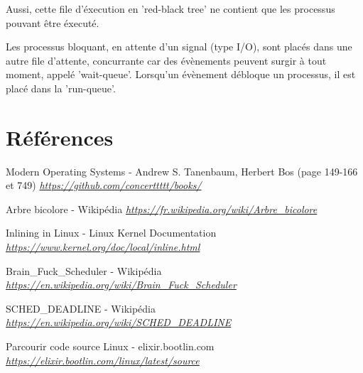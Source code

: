 \documentclass[10pt]{article}
\begin{document}
  Aussi, cette file d'éxecution en 'red-black tree' ne contient que les processus pouvant être éxecuté.
  
  Les processus bloquant, en attente d'un signal (type I/O), sont placés dans une autre file d'attente, concurrante car des évènements peuvent surgir à tout moment, appelé 'wait-queue'.
  Lorsqu'un évènement débloque un processus, il est placé dans la 'run-queue'.

    \newpage
    \section{Références}
    \begin{thebibliography}{}

        \label{modernos}
        Modern Operating Systems - Andrew S. Tanenbaum, Herbert Bos (page 149-166 et 749)\newline
        \href{https://github.com/concerttttt/books/blob/master/Modern Operating Systems 4th Edition--Andrew Tanenbaum.pdf}
        {\textit{https://github.com/concerttttt/books/}}\newline
	
        \label{rbtree}
        Arbre bicolore - Wikipédia\newline
        \href{https://fr.wikipedia.org/wiki/Arbre\_bicolore}
        {\textit{https://fr.wikipedia.org/wiki/Arbre\_bicolore}}\newline
	
        \label{inlinefunc}
        Inlining in Linux - Linux Kernel Documentation\newline
        \href{https://www.kernel.org/doc/local/inline.html}
        {\textit{https://www.kernel.org/doc/local/inline.html}}\newline
               
        \label{bfssched}
        Brain\_Fuck\_Scheduler - Wikipédia\newline
        \href{https://en.wikipedia.org/wiki/Brain\_Fuck\_Scheduler}
        {\textit{https://en.wikipedia.org/wiki/Brain\_Fuck\_Scheduler}}\newline

        \label{deadsched}
        SCHED\_DEADLINE - Wikipédia\newline
        \href{https://en.wikipedia.org/wiki/SCHED\_DEADLINE}
        {\textit{https://en.wikipedia.org/wiki/SCHED\_DEADLINE}}\newline
        
        \label{elixir}
        Parcourir code source Linux - elixir.bootlin.com\newline
        \href{https://elixir.bootlin.com/linux/latest/source}
        {\textit{https://elixir.bootlin.com/linux/latest/source}}\newline
    \end{thebibliography}
    
\end{document}
